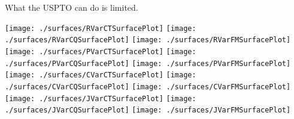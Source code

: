 \documentclass[12pt]{texmemo} %
\begin{document}
What the USPTO can do is limited. 

\newpage
\printbibliography

\texttt{[image: ./surfaces/RVarCTSurfacePlot]}
\texttt{[image: ./surfaces/RVarCQSurfacePlot]}
\texttt{[image: ./surfaces/RVarFMSurfacePlot]}
\texttt{[image: ./surfaces/PVarCTSurfacePlot]}
\texttt{[image: ./surfaces/PVarCQSurfacePlot]}
\texttt{[image: ./surfaces/PVarFMSurfacePlot]}
\texttt{[image: ./surfaces/CVarCTSurfacePlot]}
\texttt{[image: ./surfaces/CVarCQSurfacePlot]}
\texttt{[image: ./surfaces/CVarFMSurfacePlot]}
\texttt{[image: ./surfaces/JVarCTSurfacePlot]}
\texttt{[image: ./surfaces/JVarCQSurfacePlot]}
\texttt{[image: ./surfaces/JVarFMSurfacePlot]}
\end{document}
